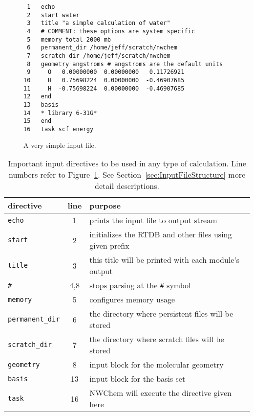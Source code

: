 \documentclass[letterpaper,12pt]{article}
\begin{document}
\begin{figure}
    \caption{A very simple input file.}
    \label{fig:WaterSimple}
    \begin{verbatim}
 1   echo
 2   start water
 3   title "a simple calculation of water"
 4   # COMMENT: these options are system specific
 5   memory total 2000 mb
 6   permanent_dir /home/jeff/scratch/nwchem
 7   scratch_dir /home/jeff/scratch/nwchem
 8   geometry angstroms # angstroms are the default units
 9     O   0.00000000  0.00000000   0.11726921
10     H   0.75698224  0.00000000  -0.46907685
11     H  -0.75698224  0.00000000  -0.46907685
12   end
13   basis
14   * library 6-31G*
15   end
16   task scf energy
    \end{verbatim}
\end{figure}

\begin{table}[!hp]
    \label{tab:BasicInput}
    \caption{Important input directives to be used in any type of calculation.  Line numbers refer to Figure~\ref{fig:WaterSimple}.  See Section~\ref{sec:InputFileStructure} more detail descriptions.}
    \begin{tabular}{lcl}
        \hline\hline
        directive               & line  & purpose \\
        \hline
        \texttt{echo}           & 1   & prints the input file to output stream \\
        \texttt{start}          & 2   & initializes the RTDB and other files using given prefix \\
        \texttt{title}          & 3   & this title will be printed with each module's output \\
        \texttt{\#}             & 4,8 & stops parsing at the \texttt{\#} symbol \\
        \texttt{memory}         & 5   & configures memory usage \\
        \texttt{permanent\_dir} & 6   & the directory where persistent files will be stored \\
        \texttt{scratch\_dir}   & 7   & the directory where scratch files will be stored \\
        \texttt{geometry}       & 8   & input block for the molecular geometry \\
        \texttt{basis}          & 13  & input block for the basis set \\
        \texttt{task}           & 16  & NWChem will execute the directive given here \\
        \hline\hline
    \end{tabular}
\end{table}
\end{document}
